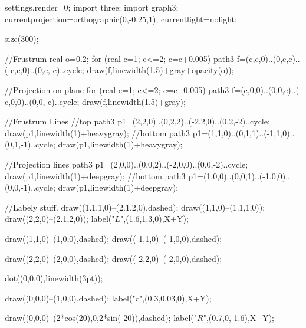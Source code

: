 
  	settings.render=0;
	import three;
    import graph3;
    currentprojection=orthographic(0,-0.25,1);
    currentlight=nolight;

	size(300);
	
	//Frustrum
	real o=0.2;
	for (real c=1; c<=2; c=c+0.005)
	{
		path3 f=(c,c,0)..(0,c,c)..(-c,c,0)..(0,c,-c)..cycle;
		draw(f,linewidth(1.5)+gray+opacity(o));
	}
	
	//Projection on plane
	for (real c=1; c<=2; c=c+0.005)
	{
		path3 f=(c,0,0)..(0,0,c)..(-c,0,0)..(0,0,-c)..cycle;
		draw(f,linewidth(1.5)+gray);
	}
	
		
	//Frustrum Lines
	//top
	path3 p1=(2,2,0)..(0,2,2)..(-2,2,0)..(0,2,-2)..cycle;	
	draw(p1,linewidth(1)+heavygray);
	//bottom
	path3 p1=(1,1,0)..(0,1,1)..(-1,1,0)..(0,1,-1)..cycle;
	draw(p1,linewidth(1)+heavygray);
	
	//Projection lines
	path3 p1=(2,0,0)..(0,0,2)..(-2,0,0)..(0,0,-2)..cycle;	
	draw(p1,linewidth(1)+deepgray);
	//bottom
	path3 p1=(1,0,0)..(0,0,1)..(-1,0,0)..(0,0,-1)..cycle;
	draw(p1,linewidth(1)+deepgray);


	//Labely stuff.
	draw((1.1,1,0)--(2.1,2,0),dashed);
	draw((1,1,0)--(1.1,1,0));
	draw((2,2,0)--(2.1,2,0));
	label("$L$",(1.6,1.3,0),X+Y);

	draw((1,1,0)--(1,0,0),dashed);
	draw((-1,1,0)--(-1,0,0),dashed);
	
	draw((2,2,0)--(2,0,0),dashed);
	draw((-2,2,0)--(-2,0,0),dashed);
	
	dot((0,0,0),linewidth(3pt));
	
	draw((0,0,0)--(1,0,0),dashed);
	label("$r$",(0.3,0.03,0),X+Y);
	
	draw((0,0,0)--(2*cos(20),0,2*sin(-20)),dashed);
	label("$R$",(0.7,0,-1.6),X+Y);